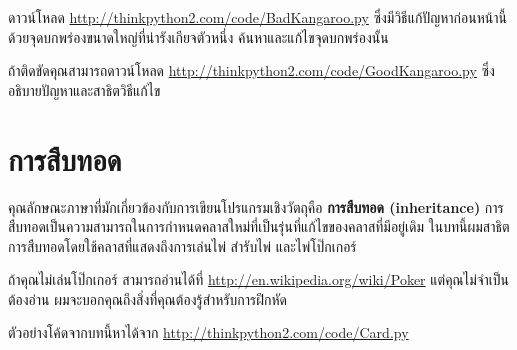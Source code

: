 \begin{exercise}
ดาวน์โหลด \url{http://thinkpython2.com/code/BadKangaroo.py} 
ซึ่งมีวิธีแก้ปัญหาก่อนหน้านี้ด้วยจุดบกพร่องขนาดใหญ่ที่น่ารังเกียจตัวหนึ่ง ค้นหาและแก้ไขจุดบกพร่องนั้น



ถ้าติดขัดคุณสามารถดาวน์โหลด \url{http://thinkpython2.com/code/GoodKangaroo.py} ซึ่งอธิบายปัญหาและสาธิตวิธีแก้ไข


\end{exercise}



\chapter{การสืบทอด} %


คุณลักษณะภาษาที่มักเกี่ยวข้องกับการเขียนโปรแกรมเชิงวัตถุคือ {\bf การสืบทอด (inheritance)} การสืบทอดเป็นความสามารถในการกำหนดคลาสใหม่ที่เป็นรุ่นที่แก้ไขของคลาสที่มีอยู่เดิม
ในบทนี้ผมสาธิตการสืบทอดโดยใช้คลาสที่แสดงถึงการเล่นไพ่ สำรับไพ่ และไพ่โป๊กเกอร์


ถ้าคุณไม่เล่นโป๊กเกอร์ สามารถอ่านได้ที่ \url{http://en.wikipedia.org/wiki/Poker} แต่คุณไม่จำเป็นต้องอ่าน ผมจะบอกคุณถึงสิ่งที่คุณต้องรู้สำหรับการฝึกหัด



ตัวอย่างโค้ดจากบทนี้หาได้จาก \url{http://thinkpython2.com/code/Card.py}


